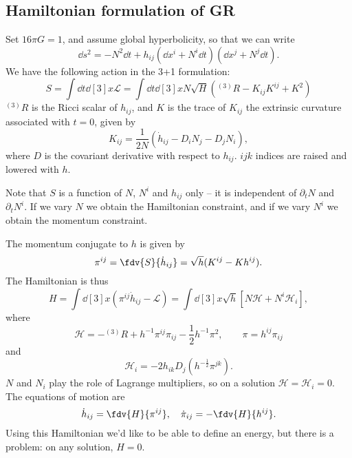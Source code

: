 \documentclass{jknotes}
\begin{document}
\subsection{Hamiltonian formulation of GR}
Set \(16\pi G=1\), and assume global hyperbolicity, so that we can write
\begin{equation}
    \dd{s}^2 = -N^2\dd{t} + h_{ij}(\dd{x}^i + N^i\dd{t})(\dd{x}^j + N^j\dd{t}).
\end{equation}
We have the following action in the 3+1 formulation:
\begin{equation}
    S = \int\dd{t}\dd[3]{x} \mathcal{L} = \int \dd{t}\dd[3]{x}N\sqrt{H}\left({}^{(3)}R - K_{ij}K^{ij} + K^2\right)
\end{equation}
\({}^{(3)}R\) is the Ricci scalar of \(h_{ij}\), and \(K\) is the trace of \(K_{ij}\) the extrinsic curvature associated with \(t=0\), given by
\begin{equation}
    K_{ij} = \frac{1}{2N}(\dot{h}_{ij} - D_iN_j-D_jN_i),
\end{equation}
where \(D\) is the covariant derivative with respect to \(h_{ij}\). \(ijk\) indices are raised and lowered with \(h\).

Note that \(S\) is a function of \(N\), \(N^i\) and \(h_{ij}\) only -- it is independent of \(\partial_t N\) and \(\partial_t N^i\). If we vary \(N\) we obtain the Hamiltonian constraint, and if we vary \(N^i\) we obtain the momentum constraint.

The momentum conjugate to \(h\) is given by
\begin{equation}
    \pi^{ij} = \fdv{S}{\dot{h}_{ij}} = \sqrt{h}(K^{ij}-Kh^{ij}).
\end{equation}
The Hamiltonian is thus
\begin{equation}
    H = \int \dd[3]{x}(\pi^{ij}\dot{h}_{ij} - \mathcal{L}) = \int \dd[3]{x} \sqrt{h}[N\mathcal{H} + N^i\mathcal{H}_i],
\end{equation}
where
\begin{equation}
    \mathcal{H} = -{}^{(3)}R + h^{-1}\pi^{ij}\pi_{ij} - \frac{1}{2}h^{-1}\pi^2, \qquad \pi=h^{ij}\pi_{ij}
\end{equation}
and
\begin{equation}
    \mathcal{H}_i = -2h_{ik}D_j\left(h^{-\frac{1}{2}}\pi^{jk}\right).
\end{equation}
\(N\) and \(N_i\) play the role of Lagrange multipliers, so on a solution \(\mathcal{H}=\mathcal{H}_i=0\). The equations of motion are 
\begin{equation}
    \dot{h}_{ij} = \fdv{H}{\pi^{ij}},\quad \dot{\pi}_{ij} = - \fdv{H}{h^{ij}}.
\end{equation}
Using this Hamiltonian we'd like to be able to define an energy, but there is a problem: on any solution, \(H=0\).
\end{document}
